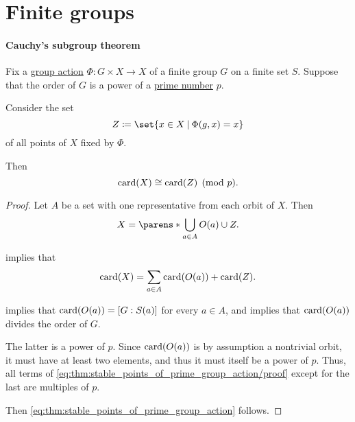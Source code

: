 \section{Finite groups}\label{sec:finite_groups}

\paragraph{Cauchy's subgroup theorem}

\begin{lemma}\label{thm:stable_points_of_prime_group_action}
  Fix a \hyperref[def:group_action]{group action} \( \Phi: G \times X \to X \) of a  finite group \( G \) on a finite set \( S \). Suppose that the order of \( G \) is a power of a \hyperref[def:prime_number]{prime number} \( p \).

  Consider the set
  \begin{equation}\label{eq:thm:stable_points_of_prime_group_action/fixed}
    Z \coloneqq \set{ x \in X \given \Phi(g, x) = x }
  \end{equation}
  of all points of \( X \) fixed by \( \Phi \).

  Then
  \begin{equation}\label{eq:thm:stable_points_of_prime_group_action}
    \operatorname{card}(X) \cong \operatorname{card}(Z) \pmod p.
  \end{equation}
\end{lemma}
\begin{proof}
  Let \( A \) be a set with one representative from each  orbit of \( X \). Then
  \begin{equation*}
    X = \parens*{ \bigcup_{a \in A} O(a) } \cup Z.
  \end{equation*}

   implies that
  \begin{equation}\label{eq:thm:stable_points_of_prime_group_action/proof}
    \operatorname{card}(X) = \sum_{a \in A} \operatorname{card}(O(a)) + \operatorname{card}(Z).
  \end{equation}

   implies that \( \operatorname{card}(O(a)) = [G: S(a)] \) for every \( a \in A \), and  implies that \( \operatorname{card}(O(a)) \) divides the order of \( G \).

  The latter is a power of \( p \). Since \( \operatorname{card}(O(a)) \) is by assumption a nontrivial orbit, it must have at least two elements, and thus it must itself be a power of \( p \). Thus, all terms of \eqref{eq:thm:stable_points_of_prime_group_action/proof} except for the last are multiples of \( p \).

  Then \eqref{eq:thm:stable_points_of_prime_group_action} follows.
\end{proof}

